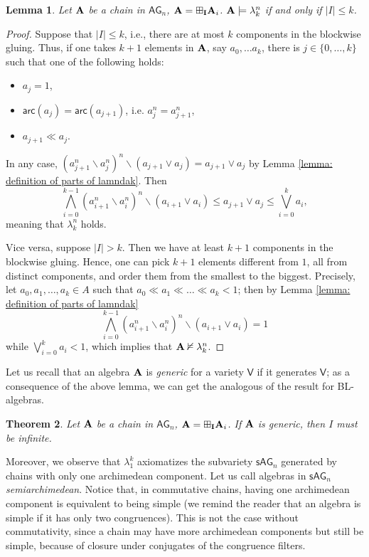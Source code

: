 \documentclass{amsart}
\newtheorem{theorem}{Theorem}[section]
\newtheorem{lemma}[theorem]{Lemma}
\theoremstyle{definition}
\numberwithin{equation}{section}
\newcommand{\join}{\vee}
\newcommand{\alg}[1]{{\textbf{\upshape #1}}}  %
\newcommand{\vv}[1]{\mathsf {#1}}
\newcommand{\arc}[1]{{\vv{arc}}(#1)}
\newcommand{\BG}{\vv{AG}}
\newcommand{\ssBG}{\vv{sAG}}
\begin{document}
\begin{lemma}\label{lemma: axiomatization via lambdak}
	Let $\alg A$ be a chain in $\BG_n$, $\alg A = \boxplus_{\alg I} \alg A_i$. $\alg A \models \lambda_k^n$ if and only if $|I| \leq k$.
\end{lemma}
\begin{proof}
	Suppose that $|I| \leq k$, i.e., there are at most $k$ components in the blockwise gluing. Thus, if one takes $k+1$ elements in $\alg A$, say $a_0, \dots a_k$, there is $j \in \{0, \ldots, k\}$ such that one of the following holds:
	\begin{itemize}
		\item $a_j = 1$,
		\item $\arc {a_{j}} = \arc {a_{j+1}}$, i.e. $a_j^n = a_{j+1}^n$,
		\item $a_{j +1} \ll a_j$.
	\end{itemize}
	In any case, $(a_{j+1}^n \backslash a_j^n)^n \backslash (a_{j+1} \vee a_j)=a_{j+1}\join a_j$ by Lemma \ref{lemma: definition of parts of lamndak}. Then $$\bigwedge_{i=0}^{k-1} (a_{i+1}^n \backslash a_i^n)^n \backslash (a_{i+1} \vee a_i)\leq a_{j+1}\join a_j \leq \bigvee_{i=0}^{k}a_i,$$ meaning that  $\lambda_k^n$ holds.
	
	Vice versa, suppose $| I | > k$. Then we have at least $k+1$ components in the blockwise gluing. Hence, one can pick $k+1$ elements different from $1$, all from distinct components, and order them from the smallest to the biggest. Precisely, let $a_0, a_1, \dots , a_k \in A$ such that $a_0 \ll a_1 \ll \dots \ll a_k < 1$; then by Lemma \ref{lemma: definition of parts of lamndak} $$\bigwedge_{i=0}^{k-1} (a_{i+1}^n \backslash a_i^n)^n \backslash (a_{i+1}\vee a_i)=1$$ while $\bigvee_{i=0}^{k}a_i < 1$, which implies that $\alg A \nvDash \lambda_k^n$. 
\end{proof}
 Let us recall that an algebra $\alg A$ is {\em generic} for a variety $\vv V$ if it generates $\vv V$; as a consequence of the above lemma, we can get the analogous of the result \cite[Corollary 4.3]{AM2003} for BL-algebras.
 \begin{theorem}
	Let $\alg A$ be a chain in $\BG_n$, $\alg A = \boxplus_{\alg I} \alg A_i$. If $\alg A$ is generic, then $I$ must be infinite. 
\end{theorem}
Moreover, we observe that $\lambda_1^k$ axiomatizes the subvariety $\ssBG_n$ generated by chains with only one archimedean component. Let us call algebras in $\ssBG_n$  {\em semiarchimedean}. Notice that, in commutative chains, having one archimedean component is equivalent to being simple (we remind the reader that an algebra is simple if it has only two congruences). This is not the case without commutativity, since a chain may have more archimedean components but still be simple, because of closure under conjugates of the congruence filters.
\end{document}
